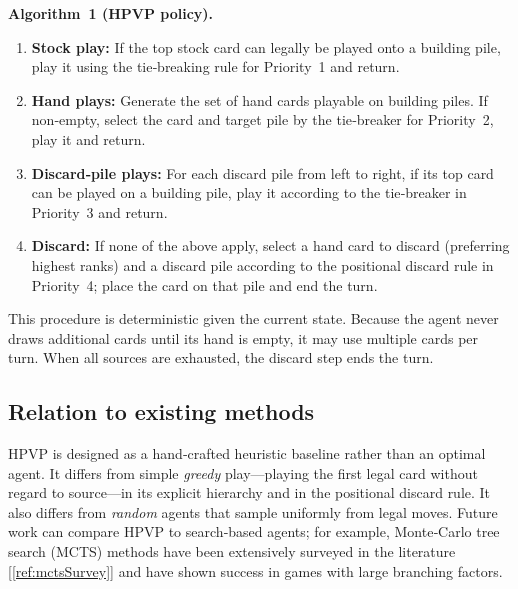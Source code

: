 \documentclass[11pt]{article}
\begin{document}
\textbf{Algorithm 1 (HPVP policy).}
\begin{enumerate}
\item \textbf{Stock play:} If the top stock card can legally be played onto a building pile, play it using the tie‑breaking rule for Priority~1 and return.
\item \textbf{Hand plays:} Generate the set of hand cards playable on building piles. If non‑empty, select the card and target pile by the tie‑breaker for Priority~2, play it and return.
\item \textbf{Discard‑pile plays:} For each discard pile from left to right, if its top card can be played on a building pile, play it according to the tie‑breaker in Priority~3 and return.
\item \textbf{Discard:} If none of the above apply, select a hand card to discard (preferring highest ranks) and a discard pile according to the positional discard rule in Priority~4; place the card on that pile and end the turn.
\end{enumerate}

This procedure is deterministic given the current state. Because the agent never draws additional cards until its hand is empty, it may use multiple cards per turn. When all sources are exhausted, the discard step ends the turn.

\subsection{Relation to existing methods}
HPVP is designed as a hand‑crafted heuristic baseline rather than an optimal agent. It differs from simple \emph{greedy} play—playing the first legal card without regard to source—in its explicit hierarchy and in the positional discard rule. It also differs from \emph{random} agents that sample uniformly from legal moves. Future work can compare HPVP to search‑based agents; for example, Monte‑Carlo tree search (MCTS) methods have been extensively surveyed in the literature\,[\ref{ref:mctsSurvey}] and have shown success in games with large branching factors.
\end{document}
